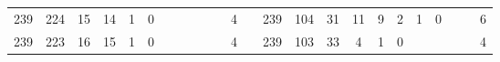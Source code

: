 {\begin{tabular}{cccccccccccclccccccccccc}
239                                                & 224                                                & 15                                               & 14                                               & 1                                                & 0                                                &                                                 &                                                 &                                                 &                                                 &                                                 & 4                                                &                          & 239                                                & 104                                                & 31                                               & 11                                               & 9                                               & 2                                               & 1                                               & 0                                               &                                                 &                                                 & 6                                                \\
239                                                & 223                                                & 16                                               & 15                                               & 1                                                & 0                                                &                                                 &                                                 &                                                 &                                                 &                                                 & 4                                                &                          & 239                                                & 103                                                & 33                                               & 4                                                & 1                                               & 0                                               &                                                 &                                                 &                                                 &                                                 & 4                                                \\

\end{tabular}}
